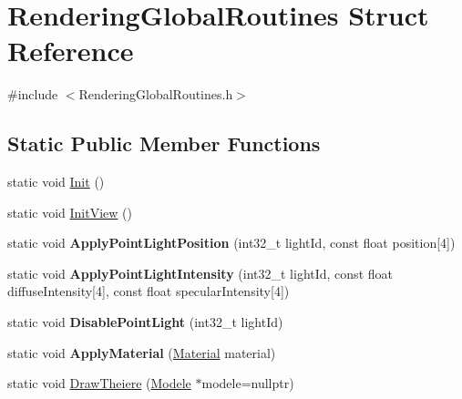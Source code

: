 \hypertarget{structRenderingGlobalRoutines}{}\section{Rendering\+Global\+Routines Struct Reference}
\label{structRenderingGlobalRoutines}


{\ttfamily \#include $<$Rendering\+Global\+Routines.\+h$>$}

\subsection*{Static Public Member Functions}
\begin{DoxyCompactItemize}
\item 
static void \mbox{\hyperlink{structRenderingGlobalRoutines_adb0a8e5310950bc9675342df59998fc5}{Init}} ()
\item 
static void \mbox{\hyperlink{structRenderingGlobalRoutines_a4e853aeabd168692f76824ae8c0f9624}{Init\+View}} ()
\item 
\mbox{\label{structRenderingGlobalRoutines_a1fcdcc1259c08882bfd8d625aa1f406c}} 
static void {\bfseries Apply\+Point\+Light\+Position} (int32\+\_\+t light\+Id, const float position\mbox{[}4\mbox{]})
\item 
\mbox{\label{structRenderingGlobalRoutines_a6bfb5bd0e4675d314ed36e2f278c469d}} 
static void {\bfseries Apply\+Point\+Light\+Intensity} (int32\+\_\+t light\+Id, const float diffuse\+Intensity\mbox{[}4\mbox{]}, const float specular\+Intensity\mbox{[}4\mbox{]})
\item 
\mbox{\label{structRenderingGlobalRoutines_ad6a73eed8524b59f448379bec56ccd00}} 
static void {\bfseries Disable\+Point\+Light} (int32\+\_\+t light\+Id)
\item 
\mbox{\label{structRenderingGlobalRoutines_abea8490192e0c378c78893f2fd18a5ea}} 
static void {\bfseries Apply\+Material} (\mbox{\hyperlink{classMaterial}{Material}} material)
\item 
static void \mbox{\hyperlink{structRenderingGlobalRoutines_a13f7fddc36582fe3bbba36c61f75153a}{Draw\+Theiere}} (\mbox{\hyperlink{classModele}{Modele}} $\ast$modele=nullptr)
\item 

\end{DoxyCompactItemize}
